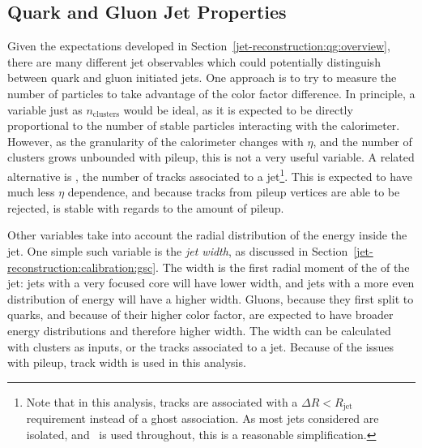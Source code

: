 
\subsection{Quark and Gluon Jet Properties}
\label{jet-reconstruction:qg:properties}

Given the expectations developed in Section~\ref{jet-reconstruction:qg:overview}, there are many different jet observables which could potentially distinguish between quark and gluon initiated jets. One approach is to try to measure the number of particles to take advantage of the color factor difference. In principle, a variable just as $n_\mathrm{clusters}$ would be ideal, as it is expected to be directly proportional to the number of stable particles interacting with the calorimeter. However, as the granularity of the calorimeter changes with $\eta$, and the number of clusters grows unbounded with pileup, this is not a very useful variable. A related alternative is \ntrk, the number of tracks associated to a jet\footnote{Note that in this analysis, tracks are associated with a $\Delta R < R_\mathrm{jet}$ requirement instead of a ghost association. As most jets considered are isolated, and \antikt~is used throughout, this is a reasonable simplification.}. This is expected to have much less $\eta$ dependence, and because tracks from pileup vertices are able to be rejected, is stable with regards to the amount of pileup.

Other variables take into account the radial distribution of the energy inside the jet. One simple such variable is the \textit{jet width}, as discussed in Section~\ref{jet-reconstruction:calibration:gsc}. The width is the first radial moment of the \pt of the jet: jets with a very focused core will have lower width, and jets with a more even distribution of energy will have a higher width. Gluons, because they first split to quarks, and because of their higher color factor, are expected to have broader energy distributions and therefore higher width. The width can be calculated with clusters as inputs, or the tracks associated to a jet. Because of the issues with pileup, track width is used in this analysis.

